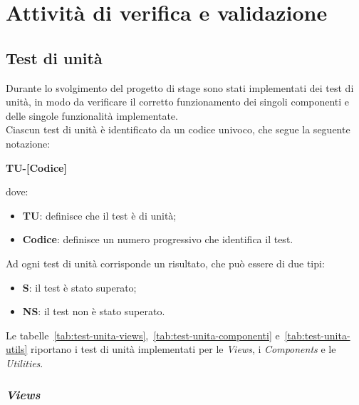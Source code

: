 \chapter{Attività di verifica e validazione}\label{cap:verifica-validazione}


\section{Test di unità}\label{sec:test-unita}
Durante lo svolgimento del progetto di stage sono stati implementati dei test di unità, in modo da verificare il corretto funzionamento
dei singoli componenti e delle singole funzionalità implementate.\\
Ciascun test di unità è identificato da un codice univoco, che segue la seguente notazione:
\begin{center}
  \textbf{TU-[Codice]}
\end{center}
dove:
\begin{itemize}
  \item \textbf{TU}: definisce che il test è di unità;
  \item \textbf{Codice}: definisce un numero progressivo che identifica il test.
\end{itemize}
Ad ogni test di unità corrisponde un risultato, che può essere di due tipi:
\begin{itemize}
  \item \textbf{S}: il test è stato superato;
  \item \textbf{NS}: il test non è stato superato.
\end{itemize}
Le tabelle~\ref{tab:test-unita-views},~\ref{tab:test-unita-componenti} e~\ref{tab:test-unita-utils} riportano i test di unità implementati per le \textit{Views}, i \textit{Components} e le \textit{Utilities}.\\

\clearpage
\subsection*{\emph{Views}}\label{subsec:test-unita-views}

